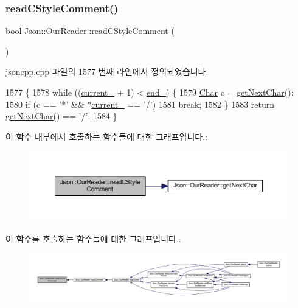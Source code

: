 \subsubsection{\texorpdfstring{read\+C\+Style\+Comment()}{readCStyleComment()}}
{\footnotesize\ttfamily bool Json\+::\+Our\+Reader\+::read\+C\+Style\+Comment (\begin{DoxyParamCaption}{ }\end{DoxyParamCaption})\hspace{0.3cm}{\ttfamily [private]}}



jsoncpp.\+cpp 파일의 1577 번째 라인에서 정의되었습니다.


\begin{DoxyCode}
1577                                   \{
1578   \textcolor{keywordflow}{while} ((\hyperlink{class_json_1_1_our_reader_a5211fbbba94be80a22dd2317c621efcc}{current\_} + 1) < \hyperlink{class_json_1_1_our_reader_ab1f69b0260c27a0d2d65dc56e42c8f9d}{end\_}) \{
1579     \hyperlink{class_json_1_1_our_reader_a0cd0bab4caa66594ab843ccd5f9dc239}{Char} c = \hyperlink{class_json_1_1_our_reader_a298285d035fdbc554caae09d9f0a5859}{getNextChar}();
1580     \textcolor{keywordflow}{if} (c == \textcolor{charliteral}{'*'} && *\hyperlink{class_json_1_1_our_reader_a5211fbbba94be80a22dd2317c621efcc}{current\_} == \textcolor{charliteral}{'/'})
1581       \textcolor{keywordflow}{break};
1582   \}
1583   \textcolor{keywordflow}{return} \hyperlink{class_json_1_1_our_reader_a298285d035fdbc554caae09d9f0a5859}{getNextChar}() == \textcolor{charliteral}{'/'};
1584 \}
\end{DoxyCode}
이 함수 내부에서 호출하는 함수들에 대한 그래프입니다.\+:\nopagebreak
\begin{figure}[H]
\begin{center}
\leavevmode
\includegraphics[width=350pt]{class_json_1_1_our_reader_aba784b125baa1b62387e767b791f2f89_cgraph}
\end{center}
\end{figure}
이 함수를 호출하는 함수들에 대한 그래프입니다.\+:\nopagebreak
\begin{figure}[H]
\begin{center}
\leavevmode
\includegraphics[width=350pt]{class_json_1_1_our_reader_aba784b125baa1b62387e767b791f2f89_icgraph}
\end{center}
\end{figure}
